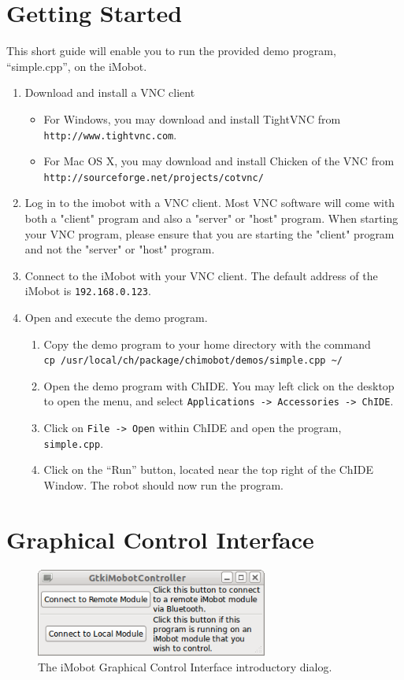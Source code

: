 \documentclass[11pt]{report}
\begin{document}
\section{Getting Started}
This short guide will enable you to run the provided demo program,
``simple.cpp'', on the iMobot.
\begin{enumerate}
\item Download and install a VNC client
  \begin{itemize}
  \item For Windows, you may download and install TightVNC from \texttt{http://www.tightvnc.com}.
  \item For Mac OS X, you may download and install Chicken of the VNC from\\
  \texttt{http://sourceforge.net/projects/cotvnc/}
  \end{itemize}
\item Log in to the imobot with a VNC client. Most VNC software will come with
both a "client" program and also a "server" or "host" program. When starting
your VNC program, please ensure that you are starting the "client" program and
not the "server" or "host" program.
\item Connect to the iMobot with your VNC client. The default address of the iMobot is \texttt{192.168.0.123}.
\item Open and execute the demo program.
  \begin{enumerate}
  \item Copy the demo program to your home directory with the command\\
  \texttt{cp /usr/local/ch/package/chimobot/demos/simple.cpp \textasciitilde/}
  \item Open the demo program with ChIDE. You may left click on the desktop to open the menu, and select \texttt{Applications -> Accessories -> ChIDE}.
  \item Click on \texttt{File -> Open} within ChIDE and open the program, \texttt{simple.cpp}. 
  \item Click on the ``Run'' button, located near the top right of the ChIDE Window. The robot should now run the program.
  \end{enumerate}
\end{enumerate}

\section{Graphical Control Interface}
\begin{figure}
\begin{center}
\includegraphics[width=3in]{images/imobot_gui_splash.png}
\caption{\label{fig:gui_splash}The iMobot Graphical Control Interface introductory dialog.}
\end{center}
\end{figure}
\end{document}
